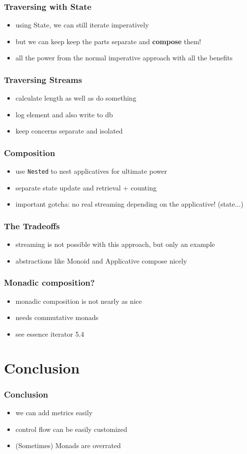 \documentclass[aspectratio=169]{beamer}
\begin{document}
\begin{frame}
  \frametitle{Traversing with State}
  \begin{itemize}
  \item using State, we can still iterate imperatively
  \item but we can keep keep the parts separate and \textbf{compose} them!
  \item all the power from the normal imperative approach with all the benefits
  \end{itemize}
\end{frame}

\begin{frame}
  \frametitle{Traversing Streams}
  \begin{itemize}
  \item calculate length as well as do something
  \item log element and also write to db
  \item keep concerns separate and isolated
  \end{itemize}
\end{frame}

\begin{frame}
  \frametitle{Composition}
  \begin{itemize}
  \item use \texttt{Nested} to nest applicatives for ultimate power
  \item separate state update and retrieval + counting
  \item important gotcha: no real streaming depending on the applicative! (state...)
  \end{itemize}
\end{frame}

\begin{frame}
  \frametitle{The Tradeoffs}
  \begin{itemize}
  \item streaming is not possible with this approach, but only an example
  \item abstractions like Monoid and Applicative compose nicely
  \end{itemize}
\end{frame}

\begin{frame}
  \frametitle{Monadic composition?}
  \begin{itemize}
  \item monadic composition is not nearly as nice
  \item needs commutative monads
  \item see essence iterator 5.4
  \end{itemize}
\end{frame}

\section{Conclusion}\label{sec:conclusion}

\begin{frame}
  \frametitle{Conclusion}
  \begin{itemize}
  \item we can add metrics easily
  \item control flow can be easily customized
  \item (Sometimes) Monads are overrated
  \end{itemize}
\end{frame}

\appendix{}
\end{document}
